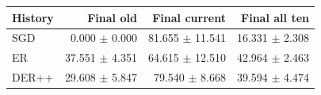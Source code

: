 \begin{tabular}{lrrr}
\toprule
History & Final old & Final current & Final all ten \\
\midrule
SGD & 0.000 $\pm$ 0.000 & 81.655 $\pm$ 11.541 & 16.331 $\pm$ 2.308 \\
ER & 37.551 $\pm$ 4.351 & 64.615 $\pm$ 12.510 & 42.964 $\pm$ 2.463 \\
DER++ & 29.608 $\pm$ 5.847 & 79.540 $\pm$ 8.668 & 39.594 $\pm$ 4.474 \\
\bottomrule
\end{tabular}

